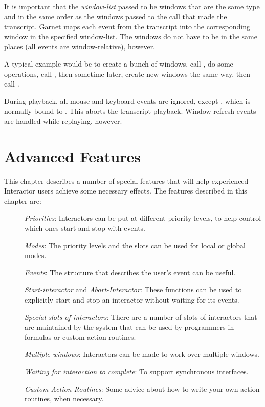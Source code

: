 It is important that the {\it window-list} passed to
 be windows that are the same type
and in the same order as the windows passed to the
 call that made
the transcript.  Garnet maps each event from the transcript into the
corresponding window in the specified window-list.  The windows do not have
to be in the same places (all events are window-relative), however.

A typical example would be to create a bunch of windows, call
, do some operations, call
, then sometime later, create new windows the
same way, then call .

During playback, all mouse and keyboard events are ignored, except
, which is normally bound to .
This aborts
the transcript playback.  Window refresh events are handled while
replaying, however.


\chapter{Advanced Features}
\label{advancedfeatures}

This chapter describes a number of special features that will help
experienced Interactor users achieve some necessary effects.  The features
described in this chapter are:
\begin{description}
\item[] {\it Priorities}:  Interactors can be put at different priority levels, to help
control which ones start and stop with events.

\item[] {\it Modes}:  The priority levels and the  slots can be used for
local or global modes.

\item[] {\it Events}:  The  structure that describes the user's event
can be useful.

\item[] {\it Start-interactor} and {\it Abort-Interactor}:  These functions can be used
to explicitly start and stop an
interactor without waiting for its events.

\item[] {\it Special slots of interactors}:  There are a number of slots of
interactors that are maintained by the system that can be used by
programmers in formulas or custom action routines.

\item[] {\it Multiple windows}:  Interactors can be made to work over multiple
windows.

\item[] {\it Waiting for interaction to complete}:  To support synchronous interfaces.

\item[] {\it Custom Action Routines}:  Some advice about how to write your own action
routines, when necessary.
\end{description}


